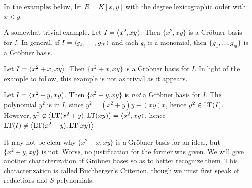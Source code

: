 In the examples below, let $R = K[x,y]$ with the degree lexicographic order with $x < y$.
\begin{example}
  \label{ex_groebner_1}
  A somewhat trivial example. Let $I = \left\langle x^2, xy \right\rangle$.
  Then $\{x^2, xy\}$ is a Gr\"obner basis for $I$.
  In general, if $I = \left\langle g_1, \ldots, g_m \right\rangle$ and each $g_i$ is a monomial,
  then $\{g_1, \ldots, g_m\}$ is a Gr\"obner basis.
\end{example}
\begin{example}
  \label{ex_groebner_2}
  Let $I = \left\langle x^2 + x, xy \right\rangle$.
  Then $\{x^2 + x, xy\}$ is a Gr\"obner basis for $I$.
  In light of the example to follow, this example is not as trivial as it appears.
\end{example}
\begin{example}
  \label{ex_groebner_3}
  Let $I = \left\langle x^2 + y, xy \right\rangle$.
  Then $\{x^2 + y, xy\}$ is \emph{not} a Gr\"obner basis for $I$.
  The polynomial $y^2$ is in $I$, since $y^2 = (x^2 + y)y - (xy)x$, hence $y^2 \in \operatorname{LT}(I)$.
  However, $y^2 \not\in \left\langle  \operatorname{LT}(x^2 + y), \operatorname{LT}(xy)  \right\rangle = \left\langle x^2, xy \right\rangle$,
  hence $\operatorname{LT}(I) \neq \left\langle  \operatorname{LT}(x^2 + y), \operatorname{LT}(xy)  \right\rangle$.
\end{example}

It may not be clear why $\{x^2 + x, xy\}$ is a Gr\"obner basis for an ideal, but $\{x^2 + y, xy\}$ is not.
Worse, no justification for the former was given.
We will give another characterization of Gr\"obner bases so as to better recognize them.
This characterization is called Buchberger's Criterion, though we must first speak of reductions and $S$-polynomials.

